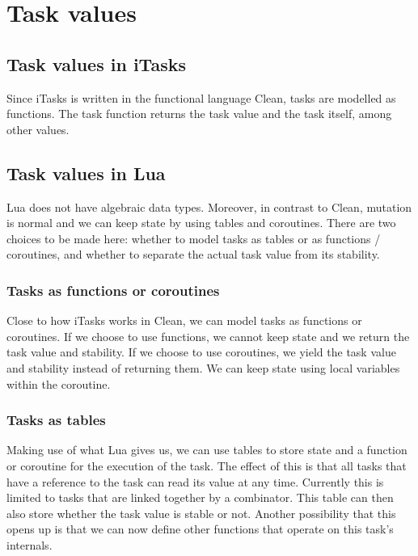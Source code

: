 \section{Task values}\label{section-task-values}

\subsection{Task values in iTasks}
Since iTasks is written in the functional language Clean, tasks are modelled as functions. The task function returns the task value and the task itself, among other values. 

\subsection{Task values in Lua}
Lua does not have algebraic data types. Moreover, in contrast to Clean, mutation is normal and we can keep state by using tables and coroutines. There are two choices to be made here: whether to model tasks as tables or as functions / coroutines, and whether to separate the actual task value from its stability.

\subsubsection{Tasks as functions or coroutines}
Close to how iTasks works in Clean, we can model tasks as functions or coroutines. If we choose to use functions, we cannot keep state and we return the task value and stability. If we choose to use coroutines, we yield the task value and stability instead of returning them. We can keep state using local variables within the coroutine.

\subsubsection{Tasks as tables}
Making use of what Lua gives us, we can use tables to store state and a function or coroutine for the execution of the task. The effect of this is that all tasks that have a reference to the task can read its value at any time. Currently this is limited to tasks that are linked together by a combinator. This table can then also store whether the task value is stable or not. Another possibility that this opens up is that we can now define other functions that operate on this task's internals.

